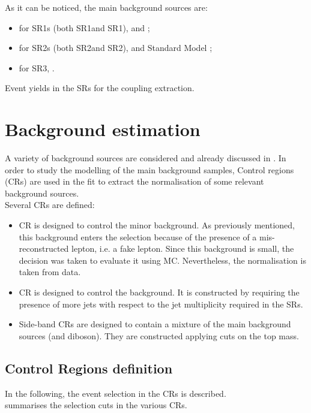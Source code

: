 As it can be noticed, the main background sources are:
\begin{itemize}
	\item for SR1s (both SR1\tZu and SR1\tZc), \ttZ and \VVHF;
	\item for SR2s (both SR2\tZu and SR2\tZc), \VVHF and Standard Model \tZq ;
	\item for SR3, \ttZ.
\end{itemize}

\begin{table}[!htbp]
	\centering
	\small
	
	\caption{Event yields in the SRs for the \tZc coupling extraction. \TabErrStatOnly} 
	\label{tab:sel:yields:tzc}
\end{table} 


\clearpage
\section{Background estimation}
\label{sec:background_all}
A variety of background sources are considered and already discussed in .
In order to study the modelling of the main background samples, Control regions (CRs) are used in the fit to extract the normalisation of some relevant background sources.\\
Several CRs are defined:
\begin{itemize}
	\item \ttbar CR is designed to control the minor \ttbar
	background. As previously mentioned, this background enters the
	selection because of the presence of a mis-reconstructed lepton,
	i.e. a fake lepton. Since this background is small, the decision was
	taken to evaluate it using MC. Nevertheless, the normalisation is
	taken from data. 
	\item \ttZ CR is designed to control the \ttZ
	background. It is constructed by requiring the presence of more jets
	with respect to the jet multiplicity required in the SRs.
	\item Side-band CRs are designed to contain a mixture
	of the main background sources (\ttZ and diboson). They are
	constructed applying cuts on the top mass.
\end{itemize}

\subsection {Control Regions definition}
\label{sec:bkg:sel}
In the following, the event selection in the CRs is described.\\
 summarises the selection cuts in the various CRs.
